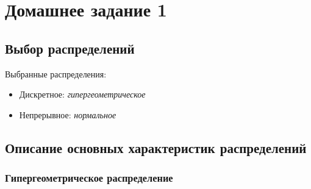 \hypertarget{ux434ux43eux43cux430ux448ux43dux435ux435-ux437ux430ux434ux430ux43dux438ux435-1}{%
\section{Домашнее задание
1}\label{ux434ux43eux43cux430ux448ux43dux435ux435-ux437ux430ux434ux430ux43dux438ux435-1}}

\hypertarget{ux432ux44bux431ux43eux440-ux440ux430ux441ux43fux440ux435ux434ux435ux43bux435ux43dux438ux439}{%
\subsection{Выбор
распределений}\label{ux432ux44bux431ux43eux440-ux440ux430ux441ux43fux440ux435ux434ux435ux43bux435ux43dux438ux439}}

Выбранные распределения:

\begin{itemize}
\tightlist
\item
  Дискретное: \emph{гипергеометрическое}
\item
  Непрерывное: \emph{нормальное}
\end{itemize}

\hypertarget{ux43eux43fux438ux441ux430ux43dux438ux435-ux43eux441ux43dux43eux432ux43dux44bux445-ux445ux430ux440ux430ux43aux442ux435ux440ux438ux441ux442ux438ux43a-ux440ux430ux441ux43fux440ux435ux434ux435ux43bux435ux43dux438ux439}{%
\subsection{Описание основных характеристик
распределений}\label{ux43eux43fux438ux441ux430ux43dux438ux435-ux43eux441ux43dux43eux432ux43dux44bux445-ux445ux430ux440ux430ux43aux442ux435ux440ux438ux441ux442ux438ux43a-ux440ux430ux441ux43fux440ux435ux434ux435ux43bux435ux43dux438ux439}}

\hypertarget{ux433ux438ux43fux435ux440ux433ux435ux43eux43cux435ux442ux440ux438ux447ux435ux441ux43aux43eux435-ux440ux430ux441ux43fux440ux435ux434ux435ux43bux435ux43dux438ux435}{%
\subsubsection{Гипергеометрическое
распределение}\label{ux433ux438ux43fux435ux440ux433ux435ux43eux43cux435ux442ux440ux438ux447ux435ux441ux43aux43eux435-ux440ux430ux441ux43fux440ux435ux434ux435ux43bux435ux43dux438ux435}}


